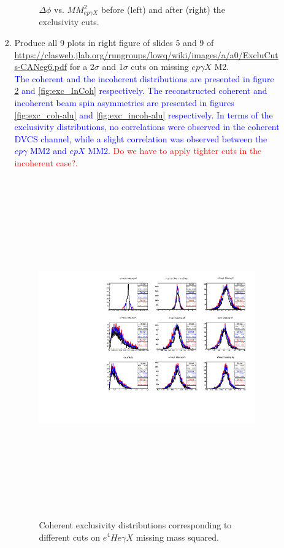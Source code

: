 \begin{enumerate}
\begin{enumerate}
\begin{enumerate}
\begin{figure}[!h]
    \caption{ $\Delta \phi$ vs. $MM^{2}_{ep\gamma X}$ before (left) and 
    after (right) the exclusivity cuts.}
    \label{fig:2d_delta_phi_MM2_InCoh}
    \end{figure}                                                                  


  \item Produce all 9 plots in right figure of slides 5 and 9 of \url{ 
     https://clasweb.jlab.org/rungroups/lowq/wiki/images/a/a0/ExcluCuts-CANeg6.pdf}   
     for a 2$\sigma$ and 1$\sigma$ cuts on missing $ep\gamma X$ M2.\\
     \textcolor{blue}{The coherent and the incoherent distributions are 
        presented in figure \ref{fig:exc_Coh} and \ref{fig:exc_InCoh} 
     respectively. The reconstructed coherent and incoherent beam spin 
  asymmetries are presented in figures \ref{fig:exc_coh-alu} and 
  \ref{fig:exc_incoh-alu} respectively. In terms of the exclusivity 
  distributions, no correlations were observed in the coherent DVCS channel, 
  while a slight correlation was observed between the $ep\gamma$ MM2 and $epX$ 
  MM2.} \textcolor{red}{Do we have to apply tighter cuts in the incoherent 
  case?.}

  \begin{figure}[tbp]
    \includegraphics[height=14.6cm]{fig/all_sigmas_coh_exc_cuts.pdf}
    \caption{Coherent exclusivity distributions corresponding to different cuts 
    on $e^{4}He\gamma X$ missing mass squared.}
    \label{fig:exc_Coh}
    \end{figure}


\end{enumerate}
\end{enumerate}
\end{enumerate}
